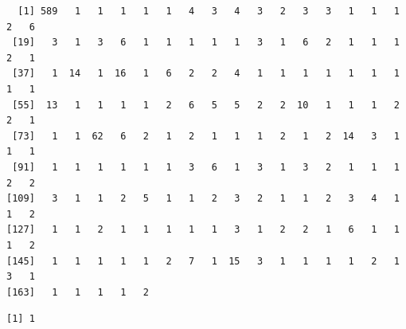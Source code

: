 \documentclass[
  letterpaper,
  DIV=11,
  numbers=noendperiod]{scrreprt}
\newenvironment{Shaded}{\begin{snugshade}}{\end{snugshade}}
\newcommand{\FunctionTok}[1]{\textcolor[rgb]{0.28,0.35,0.67}{#1}}
\newcommand{\NormalTok}[1]{\textcolor[rgb]{0.00,0.23,0.31}{#1}}
\newcommand{\OtherTok}[1]{\textcolor[rgb]{0.00,0.23,0.31}{#1}}
\newcommand{\SpecialCharTok}[1]{\textcolor[rgb]{0.37,0.37,0.37}{#1}}
\begin{document}
\begin{verbatim}
  [1] 589   1   1   1   1   1   4   3   4   3   2   3   3   1   1   1   2   6
 [19]   3   1   3   6   1   1   1   1   1   3   1   6   2   1   1   1   2   1
 [37]   1  14   1  16   1   6   2   2   4   1   1   1   1   1   1   1   1   1
 [55]  13   1   1   1   1   2   6   5   5   2   2  10   1   1   1   2   2   1
 [73]   1   1  62   6   2   1   2   1   1   1   2   1   2  14   3   1   1   1
 [91]   1   1   1   1   1   1   3   6   1   3   1   3   2   1   1   1   2   2
[109]   3   1   1   2   5   1   1   2   3   2   1   1   2   3   4   1   1   2
[127]   1   1   2   1   1   1   1   1   3   1   2   2   1   6   1   1   1   2
[145]   1   1   1   1   1   2   7   1  15   3   1   1   1   1   2   1   3   1
[163]   1   1   1   1   2
\end{verbatim}

\begin{Shaded}
\end{Shaded}

\begin{verbatim}
[1] 1
\end{verbatim}

\begin{Shaded}
\end{Shaded}
\end{document}
